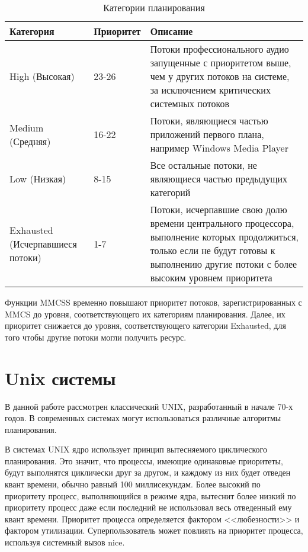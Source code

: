\begin{table}[H]
	\caption{Категории планирования}
	\begin{center}
		\begin{tabular}{|p{}|p{}|p{}|}
			\hline
			Категория & Приоритет & Описание \\ \hline
			High (Высокая)  & 23-26 & Потоки профессионального аудио запущенные с приоритетом выше, чем у других потоков на системе, за исключением критических системных потоков \\
			Medium (Средняя) & 16-22 & Потоки, являющиеся частью приложений первого плана, например Windows Media Player \\
			Low (Низкая) & 8-15 & Все остальные потоки, не являющиеся частью предыдущих категорий \\ 
			Exhausted (Исчерпавшиеся потоки) & 1-7 & Потоки, исчерпавшие свою долю времени центрального процессора, выполнение которых продолжиться, только если не будут готовы к выполнению другие потоки с более высоким уровнем приоритета \\ \hline
		\end{tabular}
	\end{center}
\end{table}

Функции MMCSS временно повышают приоритет потоков, зарегистрированных с MMCS до уровня, соответствующего их категориям планирования. Далее, их приоритет снижается до уровня, соответствующего категории Exhausted, для того чтобы другие потоки могли получить ресурс.

\section{Unix системы}
В данной работе рассмотрен классический UNIX, разработанный в начале 70-х годов. В современных системах могут использоваться различные алгоритмы планирования. 

В системах UNIX ядро использует принцип вытесняемого циклического планирования. Это значит, что процессы, имеющие одинаковые приоритеты, будут выполнятся циклически друг за другом, и каждому из них будет отведен квант времени, обычно равный 100 миллисекундам. Более высокий по приоритету процесс, выполняющийся в режиме ядра, вытеснит более низкий по приоритету процесс  даже если последний не использовал весь отведенный ему квант времени. 
Приоритет процесса определяется фактором <<любезности>> и фактором утилизации. Суперпользователь может повлиять на приоритет процесса, используя системный вызов nice. %

